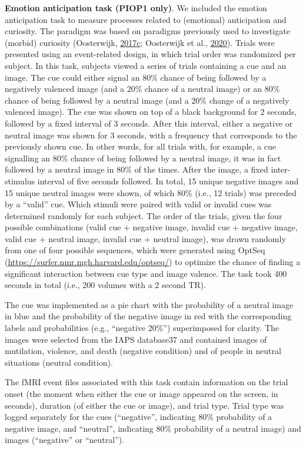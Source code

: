 \documentclass[11pt,american,a4paper,oneside,]{memoir} %
\begin{document}
\textbf{Emotion anticipation task (PIOP1 only)}. We included the emotion anticipation task to measure processes related to (emotional) anticipation and curiosity. The paradigm was based on paradigms previously used to investigate (morbid) curiosity (Oosterwijk, \protect\hyperlink{ref-Oosterwijk2017-dw}{2017}\protect\hyperlink{ref-Oosterwijk2017-dw}{c}; Oosterwijk et al., \protect\hyperlink{ref-Oosterwijk2020-uf}{2020}). Trials were presented using an event-related design, in which trial order was randomized per subject. In this task, subjects viewed a series of trials containing a cue and an image. The cue could either signal an 80\% chance of being followed by a negatively valenced image (and a 20\% chance of a neutral image) or an 80\% chance of being followed by a neutral image (and a 20\% change of a negatively valenced image). The cue was shown on top of a black background for 2 seconds, followed by a fixed interval of 3 seconds. After this interval, either a negative or neutral image was shown for 3 seconds, with a frequency that corresponds to the previously shown cue. In other words, for all trials with, for example, a cue signalling an 80\% chance of being followed by a neutral image, it was in fact followed by a neutral image in 80\% of the times. After the image, a fixed inter-stimulus interval of five seconds followed. In total, 15 unique negative images and 15 unique neutral images were shown, of which 80\% (i.e., 12 trials) was preceded by a ``valid'' cue. Which stimuli were paired with valid or invalid cues was determined randomly for each subject. The order of the trials, given the four possible combinations (valid cue + negative image, invalid cue + negative image, valid cue + neutral image, invalid cue + neutral image), was drawn randomly from one of four possible sequences, which were generated using OptSeq (\url{https://surfer.nmr.mgh.harvard.edu/optseq/}) to optimize the chance of finding a significant interaction between cue type and image valence. The task took 400 seconds in total (i.e., 200 volumes with a 2 second TR).

The cue was implemented as a pie chart with the probability of a neutral image in blue and the probability of the negative image in red with the corresponding labels and probabilities (e.g., ``negative 20\%'') superimposed for clarity. The images were selected from the IAPS database37 and contained images of mutilation, violence, and death (negative condition) and of people in neutral situations (neutral condition).

The fMRI event files associated with this task contain information on the trial onset (the moment when either the cue or image appeared on the screen, in seconds), duration (of either the cue or image), and trial type. Trial type was logged separately for the cues (``negative'', indicating 80\% probability of a negative image, and ``neutral'', indicating 80\% probability of a neutral image) and images (``negative'' or ``neutral'').
\end{document}
